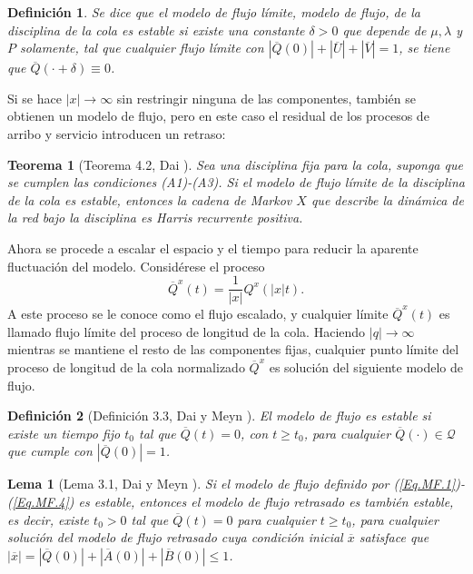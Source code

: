 \documentclass{article}
\newtheorem{Def}{Definición}[section]
\newtheorem{Teo}{Teorema}[section]
\newtheorem{Lemma}{Lema}[section]
\numberwithin{equation}{section}
\begin{document}
\begin{Def}
Se dice que el modelo de flujo l\'imite, modelo de flujo, de la disciplina de la cola es estable si existe una constante $\delta>0$ que depende de $\mu,\lambda$ y $P$ solamente, tal que cualquier flujo l\'imite con $|\overline{Q}\left(0\right)|+|\overline{U}|+|\overline{V}|=1$, se tiene que $\overline{Q}\left(\cdot+\delta\right)\equiv0$.
\end{Def}

Si se hace $|x|\rightarrow\infty$ sin restringir ninguna de las componentes, tambi\'en se obtienen un modelo de flujo, pero en este caso el residual de los procesos de arribo y servicio introducen un retraso:
\begin{Teo}[Teorema 4.2, Dai \cite{Dai}]\label{Tma.4.2.Dai}
Sea una disciplina fija para la cola, suponga que se cumplen las condiciones (A1)-(A3). Si el modelo de flujo l\'imite de la disciplina de la cola es estable, entonces la cadena de Markov $X$ que describe la din\'amica de la red bajo la disciplina es Harris recurrente positiva.
\end{Teo}

Ahora se procede a escalar el espacio y el tiempo para reducir la aparente fluctuaci\'on del modelo. Consid\'erese el proceso
\begin{equation}\label{Eq.3.7}
\overline{Q}^{x}\left(t\right)=\frac{1}{|x|}Q^{x}\left(|x|t\right).
\end{equation}
A este proceso se le conoce como el flujo escalado, y cualquier l\'imite $\overline{Q}^{x}\left(t\right)$ es llamado flujo l\'imite del proceso de longitud de la cola. Haciendo $|q|\rightarrow\infty$ mientras se mantiene el resto de las componentes fijas, cualquier punto l\'imite del proceso de longitud de la cola normalizado $\overline{Q}^{x}$ es soluci\'on del siguiente modelo de flujo.


\begin{Def}[Definici\'on 3.3, Dai y Meyn \cite{DaiSean}]
El modelo de flujo es estable si existe un tiempo fijo $t_{0}$ tal que $\overline{Q}\left(t\right)=0$, con $t\geq t_{0}$, para cualquier $\overline{Q}\left(\cdot\right)\in\mathcal{Q}$ que cumple con $|\overline{Q}\left(0\right)|=1$.
\end{Def}

\begin{Lemma}[Lema 3.1, Dai y Meyn \cite{DaiSean}]
Si el modelo de flujo definido por (\ref{Eq.MF.1})-(\ref{Eq.MF.4}) es estable, entonces el modelo de flujo retrasado es tambi\'en estable, es decir, existe $t_{0}>0$ tal que $\overline{Q}\left(t\right)=0$ para cualquier $t\geq t_{0}$, para cualquier soluci\'on del modelo de flujo retrasado cuya condici\'on inicial $\overline{x}$ satisface que $|\overline{x}|=|\overline{Q}\left(0\right)|+|\overline{A}\left(0\right)|+|\overline{B}\left(0\right)|\leq1$.
\end{Lemma}
\end{document}
